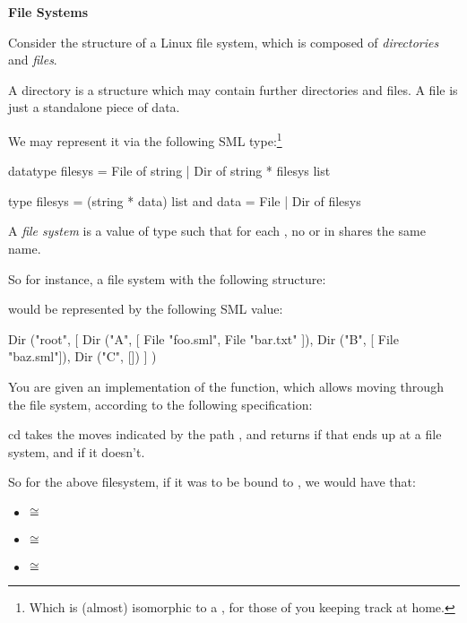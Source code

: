 \documentclass[addpoints,12pt, answers]{exam}
\begin{document}
\begin{questions}
\newpage
{}

\textbf{File Systems}

Consider the structure of a Linux file system, which is composed of \textit{directories}
and \textit{files}.

A directory is a structure which may contain further directories and files. A file
is just a standalone piece of data.

We may represent it via the following SML type:\footnote{Which is (almost) isomorphic to
a , for those of you keeping track at home.}
\begin{codeblock}
  datatype filesys =
      File of string
    | Dir of string * filesys list

  type filesys = (string * data) list
  and data = File | Dir of filesys
\end{codeblock}

A \textit{file system} is a value of type  such that for each
, no  or  in  shares the
same name.

So for instance, a file system with the following structure:

\begin{minipage}{\linewidth} %
\end{minipage}

would be represented by the following SML value:
\begin{codeblock}
  Dir ("root",
    [ Dir ("A", [ File "foo.sml", File "bar.txt" ]),
      Dir ("B", [ File "baz.sml"]),
      Dir ("C", [])
    ]
  )
\end{codeblock}

\newpage

You are given an implementation of the  function, which allows
moving through the file system, according to the following specification:

\spec
  {cd}
  {}
  {}
  { takes the moves indicated by the path ,
  and returns  if that ends up at a file system,
  and  if it doesn't.}

So for the above filesystem, if it was to be bound to , we would
have that:
\begin{itemize}
  \item {} $\cong$ 
  \item {} $\cong$ 
  \item {} $\cong$ 
\end{itemize}


\end{questions}
\end{document}
